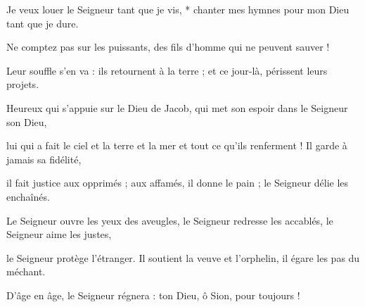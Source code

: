 \item Je veux louer le Seigneur tant que je vis, * chanter mes hymnes pour mon Dieu tant que je dure.

\item Ne comptez pas sur les puissants, des fils d'homme qui ne peuvent sauver !

\item Leur souffle s'en va : ils retournent à la terre ; et ce jour-là, périssent leurs projets.

\item Heureux qui s'appuie sur le Dieu de Jacob, qui met son espoir dans le Seigneur son Dieu,

\item lui qui a fait le ciel et la terre et la mer et tout ce qu'ils renferment ! Il garde à jamais sa fidélité,

\item il fait justice aux opprimés ; aux affamés, il donne le pain ; le Seigneur délie les enchaînés.

\item Le Seigneur ouvre les yeux des aveugles, le Seigneur redresse les accablés, le Seigneur aime les justes,

\item le Seigneur protège l'étranger. Il soutient la veuve et l'orphelin, il égare les pas du méchant.

\item D'âge en âge, le Seigneur régnera : ton Dieu, ô Sion, pour toujours !